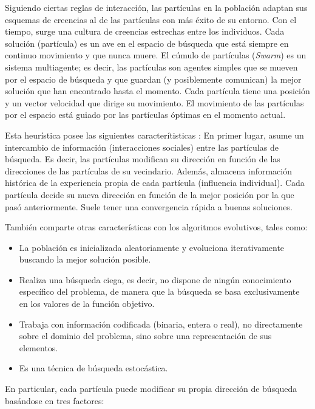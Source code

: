   Siguiendo ciertas reglas de interacci\'on, las part\'iculas en la poblaci\'on adaptan sus esquemas de creencias al de las part\'iculas 
  con m\'as \'exito de su entorno. Con el tiempo, surge una cultura de creencias estrechas entre los individuos. Cada soluci\'on 
  (part\'icula) es un ave en el espacio de b\'usqueda que est\'a 
  siempre en continuo movimiento y que nunca muere. El c\'umulo de part\'iculas (\textit{Swarm}) es un sistema multiagente; es decir, 
  las part\'iculas son agentes simples que se mueven por el espacio de b\'usqueda y que guardan (y posiblemente comunican) la mejor soluci\'on 
  que han encontrado hasta el momento. Cada part\'icula tiene una posici\'on y un vector velocidad que dirige su movimiento. El movimiento 
  de las part\'iculas por el espacio est\'a guiado por las part\'iculas \'optimas en el momento actual.
  
  Esta heur\'istica posee las siguientes caracter\'itisticas \cite{JKRBParticle}: En primer lugar, asume un intercambio de informaci\'on 
  (interacciones sociales) entre las part\'iculas de b\'usqueda. Es decir, las part\'iculas modifican su direcci\'on en funci\'on 
  de las direcciones de las part\'iculas de su vecindario. Adem\'as, almacena informaci\'on hist\'orica de la experiencia propia 
  de cada part\'icula (influencia individual). Cada part\'icula decide su nueva direcci\'on en funci\'on de la mejor posici\'on 
  por la que pas\'o anteriormente. Suele tener una convergencia r\'apida a buenas soluciones.
  
  Tambi\'en comparte otras caracter\'isticas con los algoritmos evolutivos, tales como:
  
  \begin{itemize}
   \item La poblaci\'on es inicializada aleatoriamente y evoluciona iterativamente buscando la mejor soluci\'on posible.
   \item Realiza una b\'usqueda ciega, es decir, no dispone de ning\'un conocimiento espec\'ifico del problema, de manera 
   que la b\'usqueda se basa exclusivamente en los valores de la funci\'on objetivo.
   \item Trabaja con informaci\'on codificada (binaria, entera o real), no directamente sobre el dominio del problema, sino sobre 
   una representaci\'on de sus elementos.
   \item Es una t\'ecnica de b\'usqueda estoc\'astica.
  \end{itemize}

  En particular, cada part\'icula puede modificar su propia direcci\'on de b\'usqueda bas\'andose en tres factores:
  
